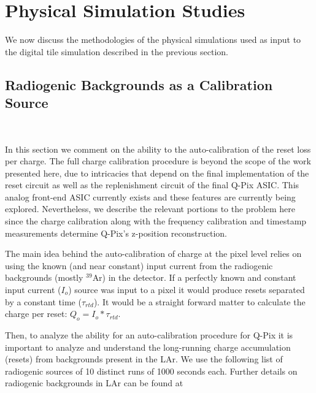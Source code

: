 \section{Physical Simulation Studies}

We now discuss the methodologies of the physical simulations used as input to the digital tile simulation described in the previous section.

\subsection{Radiogenic Backgrounds as a Calibration Source}~\label{sec:radiogenic_calib}

In this section we comment on the ability to the auto-calibration of the reset loss per charge.
The full charge calibration procedure is beyond the scope of the work presented here, due to intricacies that depend on the final implementation of the reset circuit as well as the replenishment circuit of the final Q-Pix ASIC.
This analog front-end ASIC currently exists and these features are currently being explored.
Nevertheless, we describe the relevant portions to the problem here since the charge calibration along with the frequency calibration and timestamp measurements determine Q-Pix's z-position reconstruction.

The main idea behind the auto-calibration of charge at the pixel level relies on using the known (and near constant) input current from the radiogenic backgrounds (mostly $^{39}$Ar) in the detector. 
If a perfectly known and constant input current ($I_{o}$) source was input to a pixel it would produce resets separated by a constant time ($\tau_{rtd}$).
It would be a straight forward matter to calculate the charge per reset: $Q_{o} = I_{o}*\tau_{rtd}$.

Then, to analyze the ability for an auto-calibration procedure for Q-Pix it is important to analyze and understand the long-running charge accumulation (resets) from backgrounds present in the LAr.
We use the following list of radiogenic sources of 10 distinct runs of 1000 seconds each.
Further details on radiogenic backgrounds in LAr can be found at~\citep{DUNE-FD_TDRv4:Abi_2020, ar39_backgrounds, phd_backgrounds}

